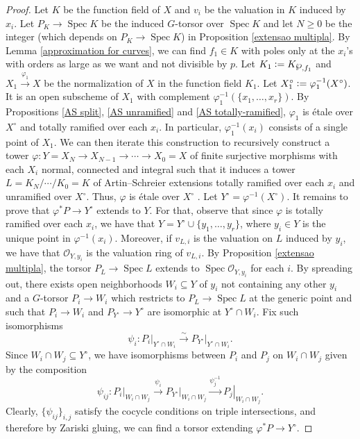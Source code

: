 \documentclass[a4paper,english,12pt]{amsart}
\numberwithin{equation}{section}
\newcommand{\defeq}{\vcentcolon=}
\newcommand{\restr}[2]{\ensuremath{\left.#1\right|_{#2}}}
\DeclareMathOperator{\Spec}{Spec}
\renewcommand{\geq}{\geqslant}
\renewcommand{\wp}{\ensuremath\raisebox{\depth}{$\mathchar"17D$}}
\renewcommand{\_}{\rule{0.25cm}{0.4pt}}
\begin{document}
\begin{proof}
    Let $K$ be the function field of $X$ and $v_{i}$ be the valuation in $K$ induced by $x_{i}$. Let $P_{K}\to \Spec K$ be the induced $G$-torsor over $\Spec K$ and let $N\geq 0$ be the integer (which depends on $P_{K}\to \Spec K$) in Proposition \ref{extensao multipla}. By Lemma \ref{approximation for curves}, we can find $f_{1}\in K$ with poles only at the $x_{i}$'s with orders as large as we want and not divisible by $p$. Let $K_{1}\defeq K_{\wp,f_{1}}$ and $X_{1}\xrightarrow{\varphi_{1}} X$ be the normalization of $X$ in the function field $K_{1}$. Let $X_{1}^{\circ}\defeq \varphi_{1}^{-1}(X^{\circ})$. It is an open subscheme of $X_{1}$ with complement $\varphi_{1}^{-1}(\{x_{1},\dots, x_{r}\})$. By Propositions \ref{AS split}, \ref{AS unramified} and \ref{AS totally-ramified}, $\varphi_{1}$ is étale over $X^{\circ}$ and totally ramified over each $x_{i}$. In particular, $\varphi_{1}^{-1}(x_{i})$ consists of a single point of $X_{1}$. We can then iterate this construction to recursively construct a tower $\varphi\colon Y=X_{N}\to X_{N-1}\to\cdots\to X_{0}=X$ of finite surjective morphisms with each $X_{i}$ normal, connected and integral such that it induces a tower $L=K_{N}/\cdots/K_{0}=K$ of Artin--Schreier extensions totally ramified over each $x_{i}$ and unramified over $X^{\circ}$. Thus, $\varphi$ is étale over $X^{\circ}$ . Let $Y^{\circ}=\varphi^{-1}(X^{\circ})$. It remains to prove that $\varphi^{\ast}P\to Y^{\circ}$ extends to $Y$. For that, observe that since $\varphi$ is totally ramified over each $x_{i}$, we have that $Y=Y^{\circ}\cup \{y_{1},\dots, y_{r}\}$, where $y_{i}\in Y$ is the unique point in $\varphi^{-1}(x_{i})$. Moreover, if $v_{L,i}$ is the valuation on $L$ induced by $y_{i}$, we have that $\mathcal{O}_{Y,y_{i}}$ is the valuation ring of $v_{L,i}$. By Proposition \ref{extensao multipla}, the torsor $P_{L}\to \Spec L$ extends to $\Spec \mathcal{O}_{Y,y_{i}}$ for each $i$. By spreading out, there exists open neighborhoods $W_{i}\subseteq Y$ of $y_{i}$ not containing any other $y_{i}$ and a $G$-torsor $P_{i}\to W_{i}$ which restricts to $P_{L}\to \Spec L$ at the generic point and such that $P_{i}\to W_{i}$ and $P_{Y^{\circ}}\to Y^{\circ}$ are isomorphic at $Y^{\circ}\cap W_{i}$. Fix such isomorphisms
    \[
    \psi_{i}\colon \restr{P_{i}}{Y^{\circ}\cap W_{i}}\xrightarrow{\sim}\restr{P_{Y^{\circ}}}{Y^{\circ}\cap W_{i}}. 
    \]
    Since $W_{i}\cap W_{j}\subseteq Y^{\circ}$, we have isomorphisms between $P_{i}$ and $P_{j}$ on $W_{i}\cap W_{j}$  given by the composition
    \[
    \psi_{ij}\colon \restr{P_{i}}{W_{i}\cap W_{j}}\xrightarrow{\psi_{i}}\restr{P_{Y^{\circ}}}{W_{i}\cap W_{j}}\xrightarrow{\psi_{j}^{-1}} \restr{P_{j}}{W_{i}\cap W_{j}}.
    \]
    Clearly, $\{\psi_{ij}\}_{i,j}$ satisfy the cocycle conditions on triple intersections, and therefore by Zariski gluing, we can find a torsor extending $\varphi^{\ast}P\to Y^{\circ}$.
\end{proof}
\end{document}
